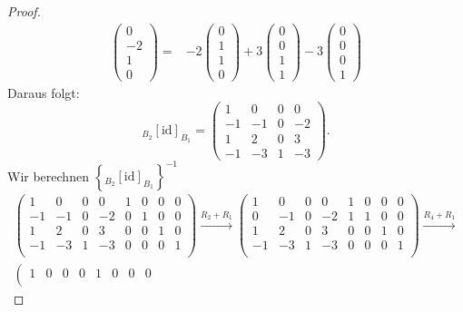 \begin{proof}
\begin{align*}
		\begin{pmatrix} 0 \\ -2 \\ 1 \\ 0 \end{pmatrix} =& -2\begin{pmatrix} 0 \\ 1 \\ 1 \\ 0 \end{pmatrix} + 3\begin{pmatrix} 0 \\ 0 \\ 1 \\ 1 \end{pmatrix} -3\begin{pmatrix} 0 \\ 0 \\ 0 \\ 1 \end{pmatrix} 
	\end{align*}
	Daraus folgt:
\[
	_{B_2}[\text{id}]_{B_1}=\begin{pmatrix} 1 & 0 & 0 & 0\\
		-1 & -1 & 0 & -2\\
		1 & 2 & 0 & 3\\
		-1 & -3 & 1 & -3
	\end{pmatrix} 
.\]
Wir berechnen $\left\{ {}_{B_2}[\text{id}]_{B_1} \right\}^{-1}$ 
{\allowdisplaybreaks
\begin{gather*}
	\left(
\begin{array}{cccc|cccc}
 1 & 0 & 0 & 0 & 1 & 0 & 0 & 0 \\
 -1 & -1 & 0 & -2 & 0 & 1 & 0 & 0 \\
 1 & 2 & 0 & 3 & 0 & 0 & 1 & 0 \\
 -1 & -3 & 1 & -3 & 0 & 0 & 0 & 1 \\
\end{array}
\right) \xrightarrow{R_2+R_1} \left(
\begin{array}{cccc|cccc}
 1 & 0 & 0 & 0 & 1 & 0 & 0 & 0 \\
 0 & -1 & 0 & -2 & 1 & 1 & 0 & 0 \\
 1 & 2 & 0 & 3 & 0 & 0 & 1 & 0 \\
 -1 & -3 & 1 & -3 & 0 & 0 & 0 & 1 \\
\end{array}
\right) \xrightarrow{R_4+R_1} \\\left(
\begin{array}{cccc|cccc}
 1 & 0 & 0 & 0 & 1 & 0 & 0 & 0 \\

\end{array}
\end{gather*}}
\end{proof}
